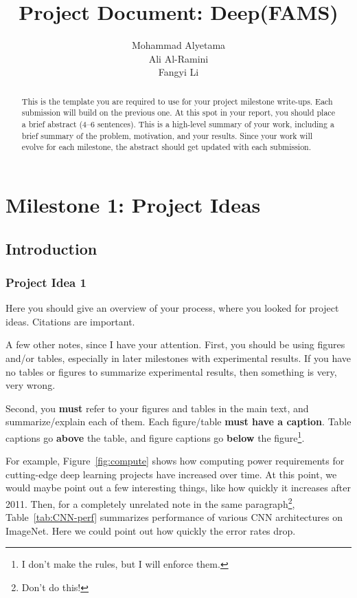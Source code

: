 \documentclass{report}
\title{Project Document: Deep(FAMS)}
\author{Mohammad Alyetama \\
Ali Al-Ramini \\
Fangyi Li }
\date{}
\begin{document}
\maketitle

\tableofcontents

\begin{abstract}
This is the template you are required to use for your project milestone write-ups.  Each submission will build on the previous one.  At this spot in your report, you should place a brief abstract (4--6 sentences). This is a high-level summary of your work, including a brief summary of the problem, motivation, and your results.  Since your work will evolve for each milestone, the abstract should get updated with each submission.
\end{abstract}

\chapter{Milestone 1: Project Ideas}

\section{Introduction}

\subsection{Project Idea 1}
Here you should give an 
overview of your process, where you looked for project ideas. Citations are important. 

A few other notes, since I have your attention. First, you should be using figures and/or tables, especially in later milestones with experimental results.  If you have no tables or figures to summarize experimental results, then something is very, very wrong. 

Second, you {\bf must} refer to your figures and tables in the main text, and summarize/explain each of  them.  Each figure/table {\bf must have a caption}.  Table captions go {\bf above} the table, and figure captions go {\bf below} the figure\footnote{I don't make the rules, but I will enforce them.}. 

For example, Figure~\ref{fig:compute} shows how computing power requirements for cutting-edge deep learning projects have increased over time. At this point, we would maybe point out a few interesting things, like how quickly it increases after 2011. Then, for a completely unrelated note in the same paragraph\footnote{Don't do this!}, Table~\ref{tab:CNN-perf} summarizes  performance of various CNN architectures on ImageNet.  Here we could point out how quickly the error rates drop. 
\end{document}
